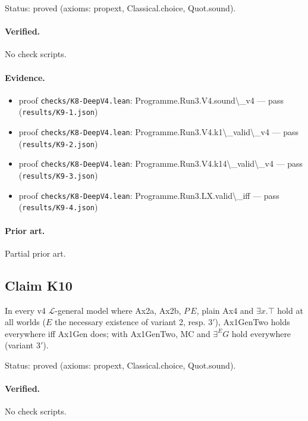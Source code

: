 \documentclass{article}
\begin{document}
Status: proved (axioms: propext, Classical.choice, Quot.sound).

\paragraph{Verified.}
No check scripts.

\paragraph{Evidence.}
\begin{itemize}
\item proof \texttt{checks/K8-DeepV4.lean}: Programme.Run3.V4.sound\textbackslash{}\_v4 --- pass (\texttt{results/K9-1.json})
\item proof \texttt{checks/K8-DeepV4.lean}: Programme.Run3.V4.k1\textbackslash{}\_valid\textbackslash{}\_v4 --- pass (\texttt{results/K9-2.json})
\item proof \texttt{checks/K8-DeepV4.lean}: Programme.Run3.V4.k14\textbackslash{}\_valid\textbackslash{}\_v4 --- pass (\texttt{results/K9-3.json})
\item proof \texttt{checks/K8-DeepV4.lean}: Programme.Run3.LX.valid\textbackslash{}\_iff --- pass (\texttt{results/K9-4.json})
\end{itemize}

\paragraph{Prior art.} Partial prior art.

\subsection*{Claim K10}

In every v4 $\mathcal L$-general model where Ax2a, Ax2b, $P\,E$, plain Ax4 and $\exists x.\top$ hold at all worlds ($E$ the necessary existence of variant 2, resp. 3$'$), Ax1GenTwo holds everywhere iff Ax1Gen does; with Ax1GenTwo, MC and $\exists^E G$ hold everywhere (variant 3$'$).

Status: proved (axioms: propext, Classical.choice, Quot.sound).

\paragraph{Verified.}
No check scripts.
\end{document}
